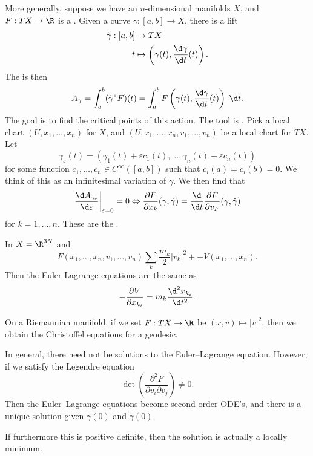 \documentclass[a4paper]{article}
\begin{document}
More generally, suppose we have an $n$-dimensional manifolds $X$, and $F: TX \to \R$ is a . Given a curve $\gamma: [a, b] \to X$, there is a lift
\begin{align*}
  \tilde{\gamma}: [a, b] &\to TX\\
  t &\mapsto \left(\gamma(t), \frac{\d \gamma}{\d t}(t)\right).
\end{align*}
The  is then
\[
  A_\gamma = \int_a^b (\tilde{\gamma}^* F)(t) = \int_a^b F\left(\gamma(t), \frac{\d \gamma}{\d t}(t)\right) \;\d t.
\]
The goal is to find the critical points of this action. The tool is .  Pick a local chart $(U, x_1, \ldots, x_n)$ for $X$, and $(U, x_1, \ldots, x_n, v_1, \ldots, v_n)$ be a local chart for $TX$. Let
\[
  \gamma_\varepsilon(t) = (\gamma_1(t) + \varepsilon c_1(t), \ldots, \gamma_n(t) + \varepsilon c_n(t)) 
\]
for some function $c_1, \ldots, c_n \in  C^\infty([a, b])$ such that $c_i(a) = c_i(b) = 0$. We think of this as an infinitesimal variation of $\gamma$. We then find that
\[
  \left.\frac{\d A_{\gamma_\varepsilon}}{\d \varepsilon} \right|_{\varepsilon = 0} = 0 \Leftrightarrow \frac{\partial F}{\partial x_k}(\gamma, \dot{\gamma}) = \frac{\d}{\d t} \frac{\partial F}{\partial v_F} (\gamma, \dot{\gamma})
\]
for $k = 1, \ldots, n$. These are the .

\begin{eg}
  In $X = \R^{3N}$ and
  \[
    F(x_1, \ldots, x_n, v_1, \ldots, v_n) \sum_k \frac{m_k}{2} |v_k|^2 + - V(x_1, \ldots, x_n).
  \]
  Then the Euler Lagrange equations are the same as
  \[
    -\frac{\partial V}{\partial x_{k_i}} = m_k \frac{\d^2 x_{k_i}}{\d t^2}.
  \]
\end{eg}

\begin{eg}
  On a Riemannian manifold, if we set $F: TX \to \R$ be $(x, v) \mapsto |v|^2$, then we obtain the Christoffel equations for a geodesic.
\end{eg}

In general, there need not be solutions to the Euler--Lagrange equation. However, if we satisfy the Legendre equation
\[
  \det \left(\frac{\partial^2 F}{\partial v_i \partial v_j}\right) \not= 0.
\]
Then the Euler--Lagrange equations become second order ODE's, and there is a unique solution given $\gamma(0)$ and $\dot{\gamma}(0)$.

If furthermore this is positive definite, then the solution is actually a locally minimum.
\end{document}
